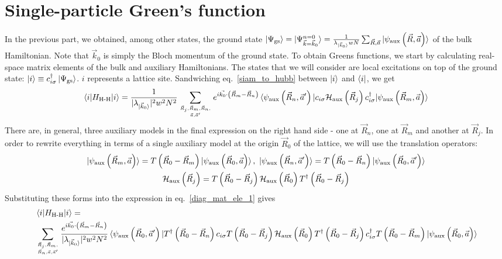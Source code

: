 \documentclass{report}
\numberwithin{equation}{section}
\begin{document}
\section{Single-particle Green's function}
In the previous part, we obtained, among other states, the ground state \(\ket{\Psi_\text{gs}} = \ket{\Psi^{n=0}_{\vec k=\vec k_0}} = \frac{1}{\lambda_{\ket{\vec k_0}} w N}\sum_{\vec R, \vec a}\ket{\psi_\text{aux}\left( \vec R, \vec a \right)}\) of the bulk Hamiltonian. Note that \(\vec k_0\) is simply the Bloch momentum of the ground state.
To obtain Greens functions, we start by calculating real-space matrix elements of the bulk and auxiliary Hamiltonians. The states that we will consider are local excitations on top of the ground state: \(\ket{i} \equiv c^\dagger_{i\sigma}\ket{\Psi_\text{gs} }\). \(i\) represents a lattice site. Sandwiching eq.~\ref{siam_to_hubb} between \(\ket{i}\) and \(\bra{i}\), we get
\begin{equation}\begin{aligned}
	\label{diag_mat_ele_1}
	\braket{i | H_\text{H-H} | i} = \frac{1}{|\lambda_{\ket{\vec k_0}}|^2 w^2 N^2}\sum_{\vec R_j, \vec R_m, \vec R_n, \atop{\vec a, \vec a^\prime}} e^{i\vec{k_0}\cdot\left(\vec{R}_m - \vec R_n\right)} \braket{\psi_\text{aux}\left( \vec R_n, \vec a^\prime \right) | c_{i\sigma} \mathcal{H}_\text{aux}\left( \vec R_j \right) c^\dagger_{i\sigma}  | \psi_\text{aux}\left( \vec R_m, \vec a \right)}
\end{aligned}\end{equation}
There are, in general, three auxiliary models in the final expression on the right hand side - one at \(\vec R_n\), one at \(\vec R_m\) and another at \(\vec R_j\). In order to rewrite everything in terms of a single auxiliary model at the origin \(\vec R_0\) of the lattice, we will use the translation operators:
\begin{gather}
	\ket{\psi_\text{aux}\left( \vec R_m, \vec a \right)} = T\left(\vec R_0 - \vec R_m\right) \ket{\psi_\text{aux}\left(\vec R_0, \vec a\right)}, ~ \ket{\psi_\text{aux}\left( \vec R_n, \vec a^\prime \right)} = T\left(\vec R_0 - \vec R_n\right) \ket{\psi_\text{aux}\left(\vec R_0, \vec a^\prime\right)}\\
	\mathcal{H}_\text{aux}\left( \vec R_j \right) = T\left(\vec R_0 - \vec R_j\right) \mathcal{H}_\text{aux}\left( \vec R_0 \right) T^\dagger\left(\vec R_0 - \vec R_j\right)
\end{gather}
Substituting these forms into the expression in eq.~\ref{diag_mat_ele_1} gives
\begin{equation}\begin{aligned}
	&\braket{i | H_\text{H-H} | i} =\\
	&\sum_{\vec R_j, \vec R_m, \atop{\vec R_n, \vec a, \vec a^\prime}} \frac{e^{i\vec{k_0}\cdot\left(\vec{R}_m - \vec R_n\right)}}{|\lambda_{\ket{\vec k_0}}|^2 w^2 N^2} \braket{\psi_\text{aux}\left( \vec R_0, \vec a^\prime \right) | T^\dagger\left( \vec R_0 - \vec R_n \right) c_{i\sigma} T\left( \vec R_0 - \vec R_j \right)\mathcal{H}_\text{aux}\left( \vec R_0 \right)T^\dagger\left( \vec R_0 - \vec R_j \right) c^\dagger_{i\sigma}  T\left( \vec R_0 - \vec R_m \right)| \psi_\text{aux}\left( \vec R_0, \vec a \right)}
\end{aligned}\end{equation}
\end{document}
